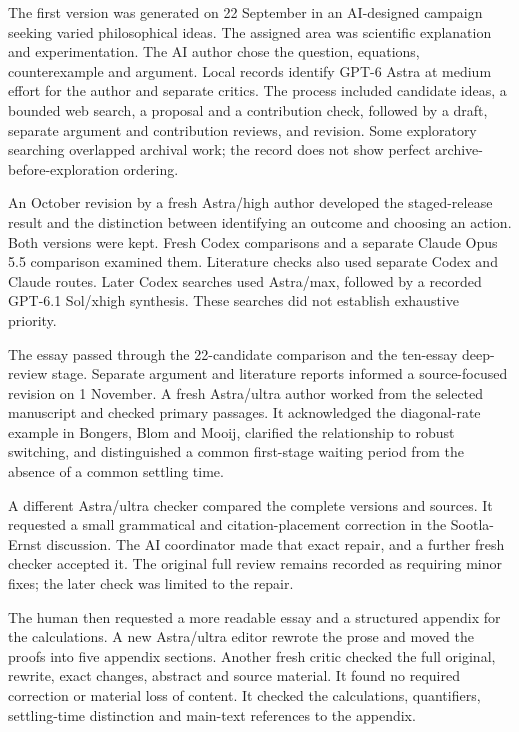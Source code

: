 The first version was generated on 22 September in an AI-designed campaign seeking varied philosophical ideas. The assigned area was scientific explanation and experimentation. The AI author chose the question, equations, counterexample and argument. Local records identify GPT-6 Astra at medium effort for the author and separate critics. The process included candidate ideas, a bounded web search, a proposal and a contribution check, followed by a draft, separate argument and contribution reviews, and revision. Some exploratory searching overlapped archival work; the record does not show perfect archive-before-exploration ordering.

An October revision by a fresh Astra/high author developed the staged-release result and the distinction between identifying an outcome and choosing an action. Both versions were kept. Fresh Codex comparisons and a separate Claude Opus 5.5 comparison examined them. Literature checks also used separate Codex and Claude routes. Later Codex searches used Astra/max, followed by a recorded GPT-6.1 Sol/xhigh synthesis. These searches did not establish exhaustive priority.

The essay passed through the 22-candidate comparison and the ten-essay deep-review stage. Separate argument and literature reports informed a source-focused revision on 1 November. A fresh Astra/ultra author worked from the selected manuscript and checked primary passages. It acknowledged the diagonal-rate example in Bongers, Blom and Mooij, clarified the relationship to robust switching, and distinguished a common first-stage waiting period from the absence of a common settling time.

A different Astra/ultra checker compared the complete versions and sources. It requested a small grammatical and citation-placement correction in the Sootla-Ernst discussion. The AI coordinator made that exact repair, and a further fresh checker accepted it. The original full review remains recorded as requiring minor fixes; the later check was limited to the repair.

The human then requested a more readable essay and a structured appendix for the calculations. A new Astra/ultra editor rewrote the prose and moved the proofs into five appendix sections. Another fresh critic checked the full original, rewrite, exact changes, abstract and source material. It found no required correction or material loss of content. It checked the calculations, quantifiers, settling-time distinction and main-text references to the appendix.

